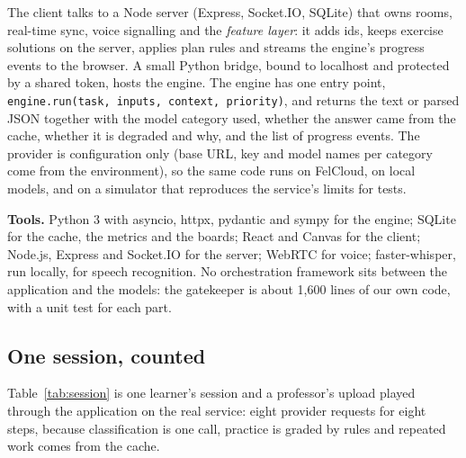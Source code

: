 \documentclass[11pt,a4paper]{article}
\newcommand{\code}[1]{\texttt{\small #1}}
\begin{document}
The client talks to a Node server (Express, Socket.IO, SQLite) that owns rooms, real-time sync, voice signalling and the
\emph{feature layer}: it adds ids, keeps exercise solutions on the server, applies plan rules and streams the engine's
progress events to the browser. A small Python bridge, bound to localhost and protected by a shared token, hosts the
engine. The engine has one entry point, \code{engine.run(task, inputs, context, priority)}, and returns the text or
parsed JSON together with the model category used, whether the answer came from the cache, whether it is degraded and
why, and the list of progress events. The provider is configuration only (base URL, key and model names per category
come from the environment), so the same code runs on FelCloud, on local models, and on a simulator that reproduces
the service's limits for tests.

\textbf{Tools.} Python 3 with asyncio, httpx, pydantic and sympy for the engine; SQLite for the cache, the metrics and
the boards; React and Canvas for the client; Node.js, Express and Socket.IO for the server; WebRTC for voice;
faster-whisper, run locally, for speech recognition. No orchestration framework sits between the application and the
models: the gatekeeper is about 1{,}600 lines of our own code, with a unit test for each part.

\subsection*{One session, counted}

Table~\ref{tab:session} is one learner's session and a professor's upload played through the application on the real
service: eight provider requests for eight steps, because classification is one call, practice is graded by rules
and repeated work comes from the cache.
\end{document}
